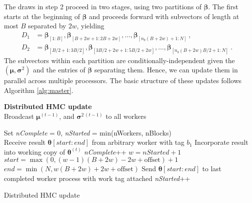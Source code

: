 \documentclass[12pt]{article}
\begin{document}
The draws in step 2 proceed in two stages, using two partitions of $\bm \beta$.
The first starts at the beginning of $\bm \beta$ and proceeds forward with subvectors of length at most $B$ separated by $2w$, yielding
\begin{align}
D_1 &= \bm \beta_{[1 : B]}, \bm \beta_{[B + 2w + 1 : 2B + 2w]}, \ldots, \bm \beta_{[n_b (B + 2w) + 1 : N]} \ , \\
D_2 &= \bm \beta_{[B/2 + 1 : 3B/2]}, \bm \beta_{[3B/2 + 2w + 1 : 5B/2 + 2w]}, \ldots, \bm \beta_{[n_b (B + 2w) B/2 + 1 : N]} \ .
\end{align}
The subvectors within each partition are conditionally-independent given the $(\bm \mu, \bm \sigma^2)$ and the entries of $\bm \beta$ separating them.
Hence, we can update them in parallel across multiple processors.
The basic structure of these updates follows Algorithm \ref{alg:master}.
%
\begin{algorithm}%
 \hspace{-8pt} \textbf{Distributed HMC update}\\

 Broadcast $\bm \mu^{(t-1)}$, and $\bm \sigma^{2\,(t-1)}$ to all workers \;

  {

 Set \textit{nComplete} = 0, \textit{nStarted} = min(nWorkers, nBlocks) \\
  {
   Receive result $\bm \theta[start:end]$ from arbitrary worker with tag $b_1$ \;
   Incorporate result into working copy of $\bm \theta^{(t)}$ \;
   \textit{nComplete}++ \;
    {
     $w = nStarted + 1$\;
     $start = \max(0, (w - 1)(B + 2w) - 2w + \mbox{offset}) + 1$\;
     $end = \min(N, w(B + 2w) + 2w + \mbox{offset})$\;
     Send $\bm \theta[start:end] $ to last completed worker process with work tag attached\;
     \textit{nStarted}++\;
   }
 }
}

 \caption{Distributed HMC update \label{alg:master}}
\end{algorithm}
\end{document}
